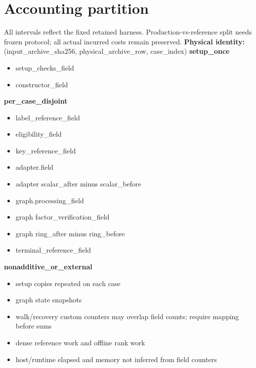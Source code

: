 \documentclass[10pt]{article}
\begin{document}
\section*{Accounting partition}
All intervals reflect the fixed retained harness. Production-vs-reference split needs frozen protocol; all actual incurred costs remain preserved.
\textbf{Physical identity:} (input\_archive\_sha256, physical\_archive\_row, case\_index)
\textbf{setup\_once}\begin{itemize}
\item setup\_checks\_field
\item constructor\_field
\end{itemize}
\textbf{per\_case\_disjoint}\begin{itemize}
\item label\_reference\_field
\item eligibility\_field
\item key\_reference\_field
\item adapter.field
\item adapter scalar\_after minus scalar\_before
\item graph.processing\_field
\item graph factor\_verification\_field
\item graph ring\_after minus ring\_before
\item terminal\_reference\_field
\end{itemize}
\textbf{nonadditive\_or\_external}\begin{itemize}
\item setup copies repeated on each case
\item graph state snapshots
\item walk/recovery custom counters may overlap field counts; require mapping before sums
\item dense reference work and offline rank work
\item host/runtime elapsed and memory not inferred from field counters
\end{itemize}
\end{document}
